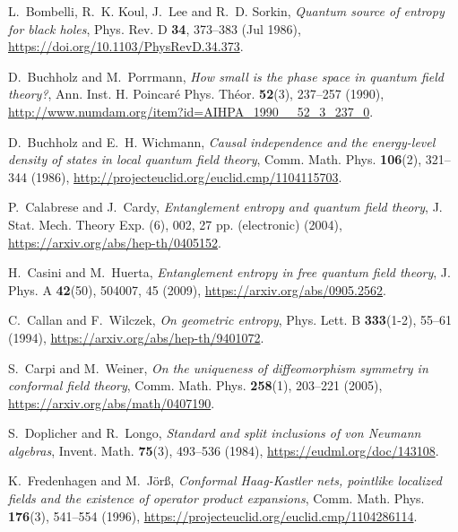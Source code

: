 \documentclass[a4paper,12pt]{article}
\theoremstyle{plain}
\theoremstyle{definition}
\theoremstyle{remark}
\begin{document}
{\begin{thebibliography}{{Haa}96}
L.~Bombelli, R.~K. Koul, J.~Lee and R.~D. Sorkin, \textsl{ Quantum source of
  entropy for black holes},
\newblock Phys. Rev. D \textbf{ 34}, 373--383 (Jul 1986),
\newblock \url{https://doi.org/10.1103/PhysRevD.34.373}.

D.~Buchholz and M.~Porrmann, \textsl{ How small is the phase space in quantum
  field theory?},
\newblock Ann. Inst. H. Poincar\'e Phys. Th\'eor. \textbf{ 52}(3), 237--257
  (1990),
\newblock \url{http://www.numdam.org/item?id=AIHPA_1990__52_3_237_0}.

D.~Buchholz and E.~H. Wichmann, \textsl{ Causal independence and the
  energy-level density of states in local quantum field theory},
\newblock Comm. Math. Phys. \textbf{ 106}(2), 321--344 (1986),
\newblock \url{http://projecteuclid.org/euclid.cmp/1104115703}.

P.~Calabrese and J.~Cardy, \textsl{ Entanglement entropy and quantum field
  theory},
\newblock J. Stat. Mech. Theory Exp. (6), 002, 27 pp. (electronic) (2004),
\newblock \url{https://arxiv.org/abs/hep-th/0405152}.

H.~Casini and M.~Huerta, \textsl{ Entanglement entropy in free quantum field
  theory},
\newblock J. Phys. A \textbf{ 42}(50), 504007, 45 (2009),
\newblock \url{https://arxiv.org/abs/0905.2562}.

C.~Callan and F.~Wilczek, \textsl{ On geometric entropy},
\newblock Phys. Lett. B \textbf{ 333}(1-2), 55--61 (1994),
\newblock \url{https://arxiv.org/abs/hep-th/9401072}.

S.~Carpi and M.~Weiner, \textsl{ On the uniqueness of diffeomorphism symmetry
  in conformal field theory},
\newblock Comm. Math. Phys. \textbf{ 258}(1), 203--221 (2005),
\newblock \url{https://arxiv.org/abs/math/0407190}.

S.~Doplicher and R.~Longo, \textsl{ Standard and split inclusions of von
  {N}eumann algebras},
\newblock Invent. Math. \textbf{ 75}(3), 493--536 (1984),
\newblock \url{https://eudml.org/doc/143108}.

K.~Fredenhagen and M.~J{\"o}r{\ss}, \textsl{ Conformal {H}aag-{K}astler nets,
  pointlike localized fields and the existence of operator product expansions},
\newblock Comm. Math. Phys. \textbf{ 176}(3), 541--554 (1996),
\newblock \url{https://projecteuclid.org/euclid.cmp/1104286114}.


\end{thebibliography}}
\end{document}

